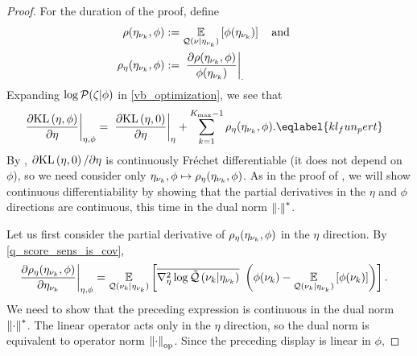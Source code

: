 \begin{proof}
For the duration of the proof, define
%
\begin{align*}
%
\rho(\etanuk, \phi) :={}&
    \expect{\q(\nu \vert \etanuk)}{\phi(\etanuk)}
\mathand\\
\rho_\eta(\etanuk, \phi) :={}&
    \fracat{\partial \rho(\etanuk, \phi)}{\phi(\etanuk)}.
%
\end{align*}
%
Expanding $\log \mathcal{P}(\zeta \vert \phi)$ in \eqref{vb_optimization}, we see that
%
\begin{align}
\fracat{\partial \KL{\eta, \phi}}{\partial \eta}{\eta, \phi}
 ={}&
    \fracat{\partial \KL{\eta, \phiz}}{\partial \eta}{\eta} +
    \sumkm \rho_\eta(\etanuk, \phi). \eqlabel{kl_fun_pert}
%
\end{align}
%
By , $\partial \mathrm{KL}\left(\eta, 0\right) / \partial \eta$ is
continuously Fr{\'e}chet differentiable (it does not depend on $\phi$), so we
need consider only $\eta_{\nu_{k}}, \phi \mapsto \rho_\eta(\eta_{\nu_{k}}, \phi)$.  As
in the proof of , we will show continuous differentiability
by showing that the partial derivatives in the $\eta$ and $\phi$ directions
are continuous, this time in the dual norm $\left\Vert\cdot\right\Vert^*$.

Let us first consider the partial derivative of $\rho_\eta(\eta_{\nu_{k}}, \phi)$ in
the $\eta$ direction. By  \eqref{q_score_sens_is_cov},
%
\begin{align*}
%
\fracat{\partial \rho_\eta(\etanuk, \phi)}{\partial \etanuk}{\eta, \phi} ={}&
\expect{\q(\nuk \vert \etanuk)}{
   \lqhessbar{\nuk \vert \etanuk}
       \left(
        \phi(\nuk) - \expect{\q(\nuk \vert \etanuk)}{\phi(\nuk)}
       \right)
       }.
%
\end{align*}
%
We need to show that the preceding expression is continuous in the dual norm
$\left\Vert\cdot\right\Vert^*$.  The linear operator acts only in the $\eta$ direction, so
the dual norm is equivalent to operator norm $\left\Vert\cdot\right\Vert_{\mathrm{op}}$.  Since
the preceding display is linear in $\phi$,


\end{proof}
